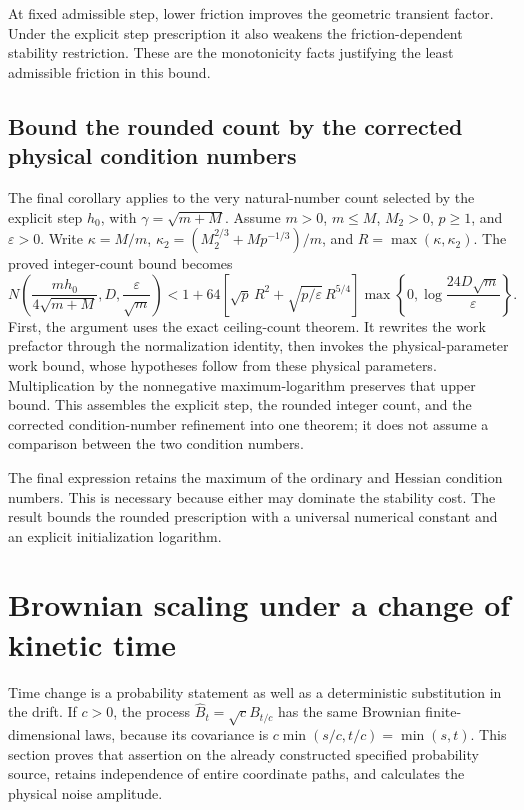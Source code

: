 \documentclass[11pt,a4paper]{report}
\begin{document}
At fixed admissible step, lower friction improves the geometric transient factor. Under the explicit step prescription it also weakens the friction-dependent stability restriction. These are the monotonicity facts justifying the least admissible friction in this bound.

\subsection{\texorpdfstring{Bound the rounded count by the corrected physical condition numbers}{Bound the rounded count by the corrected physical condition numbers}}
\label{report-step-KineticLangevin-SecondOrderComplexity-lean-7}


The final corollary applies to the very natural-number count selected by the explicit step \(h_0\), with \(\gamma=\sqrt{m+M}\). Assume \(m>0\), \(m\le M\), \(M_2>0\), \(p\ge1\), and \(\varepsilon>0\). Write \(\kappa=M/m\), \(\kappa_2=(M_2^{2/3}+Mp^{-1/3})/m\), and \(R=\max(\kappa,\kappa_2)\). The proved integer-count bound becomes \[N\!\left(\frac{mh_0}{4\sqrt{m+M}},D,\frac{\varepsilon}{\sqrt m}\right)<1+64\left[\sqrt p\,R^2+\sqrt{p/\varepsilon}\,R^{5/4}\right]\max\!\left\{0,\log\frac{24D\sqrt m}{\varepsilon}\right\}.\] First, the argument uses the exact ceiling-count theorem. It rewrites the work prefactor through the normalization identity, then invokes the physical-parameter work bound, whose hypotheses follow from these physical parameters. Multiplication by the nonnegative maximum-logarithm preserves that upper bound. This assembles the explicit step, the rounded integer count, and the corrected condition-number refinement into one theorem; it does not assume a comparison between the two condition numbers.



The final expression retains the maximum of the ordinary and Hessian condition numbers. This is necessary because either may dominate the stability cost. The result bounds the rounded prescription with a universal numerical constant and an explicit initialization logarithm.

\section{\texorpdfstring{Brownian scaling under a change of kinetic time}{Brownian scaling under a change of kinetic time}}
\label{proof-module-KineticLangevin-BrownianScaling-lean}


Time change is a probability statement as well as a deterministic substitution in the drift. If \(c>0\), the process \(\widehat B_t=\sqrt c B_{t/c}\) has the same Brownian finite-dimensional laws, because its covariance is \(c\min(s/c,t/c)=\min(s,t)\). This section proves that assertion on the already constructed specified probability source, retains independence of entire coordinate paths, and calculates the physical noise amplitude.
\end{document}
